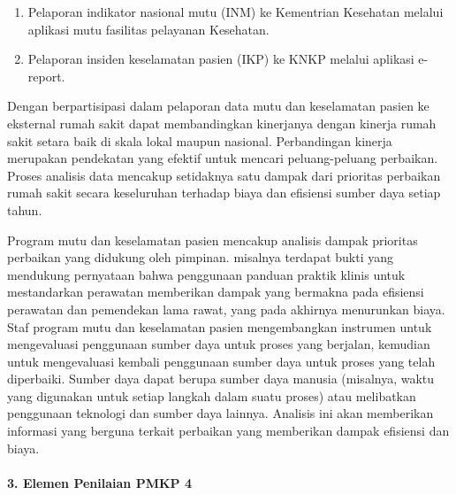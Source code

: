 \documentclass[
]{book}
\providecommand{\tightlist}{%
  \setlength{\itemsep}{0pt}\setlength{\parskip}{0pt}}
\begin{document}
\begin{enumerate}
\def\labelenumi{\alph{enumi}.}
\tightlist
\item
  Pelaporan indikator nasional mutu (INM) ke Kementrian Kesehatan melalui aplikasi mutu fasilitas pelayanan Kesehatan.
\item
  Pelaporan insiden keselamatan pasien (IKP) ke KNKP melalui aplikasi e-report.
\end{enumerate}

Dengan berpartisipasi dalam pelaporan data mutu dan keselamatan pasien ke eksternal rumah sakit dapat membandingkan kinerjanya dengan kinerja rumah sakit setara baik di skala lokal maupun nasional. Perbandingan kinerja merupakan pendekatan yang efektif untuk mencari peluang-peluang perbaikan.
Proses analisis data mencakup setidaknya satu dampak dari prioritas perbaikan rumah sakit secara keseluruhan terhadap biaya dan efisiensi sumber daya setiap tahun.

Program mutu dan keselamatan pasien mencakup analisis dampak prioritas perbaikan yang didukung oleh pimpinan. misalnya terdapat bukti yang mendukung pernyataan bahwa penggunaan panduan praktik klinis untuk mestandarkan perawatan memberikan dampak yang bermakna pada efisiensi perawatan dan pemendekan lama rawat, yang pada akhirnya menurunkan biaya. Staf program mutu dan keselamatan pasien mengembangkan instrumen untuk mengevaluasi penggunaan sumber daya untuk proses yang berjalan, kemudian untuk mengevaluasi kembali penggunaan sumber daya untuk proses yang telah diperbaiki. Sumber daya dapat berupa sumber daya manusia (misalnya, waktu yang digunakan untuk setiap langkah dalam suatu proses) atau melibatkan penggunaan teknologi dan sumber daya lainnya. Analisis ini akan memberikan informasi yang berguna terkait perbaikan yang memberikan dampak efisiensi dan biaya.

\hypertarget{elemen-penilaian-pmkp-4}{%
\paragraph*{3. Elemen Penilaian PMKP 4}\label{elemen-penilaian-pmkp-4}}
\end{document}
